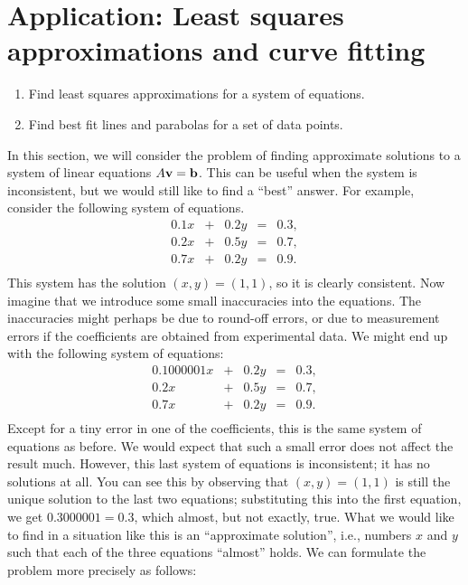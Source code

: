\section{Application: Least squares approximations and curve fitting}
\label{sec:least-squares}

\begin{outcome}
  \begin{enumerate}
  \item Find least squares approximations for a system of equations.
  \item Find best fit lines and parabolas for a set of data points.
  \end{enumerate}
\end{outcome}

In this section, we will consider the problem of finding approximate
solutions to a system of linear equations $A\vect{v}=\vect{b}$. This
can be useful when the system is inconsistent, but we would still like
to find a ``best'' answer. For example, consider the following system
of equations.
\begin{equation*}
  \begin{array}{rcrcl}
    0.1 x &+& 0.2 y &=& 0.3, \\
    0.2 x &+& 0.5 y &=& 0.7, \\
    0.7 x &+& 0.2 y &=& 0.9. \\
  \end{array}
\end{equation*}
This system has the solution $(x,y)=(1,1)$, so it is clearly
consistent. Now imagine that we introduce some small inaccuracies into
the equations. The inaccuracies might perhaps be due to round-off
errors, or due to measurement errors if the coefficients are obtained
from experimental data. We might end up with the following system of
equations:
\begin{equation*}
  \begin{array}{rcrcl}
    0.1000001 x &+& 0.2 y &=& 0.3, \\
    0.2 x &+& 0.5 y &=& 0.7, \\
    0.7 x &+& 0.2 y &=& 0.9. \\
  \end{array}
\end{equation*}
Except for a tiny error in one of the coefficients, this is the same
system of equations as before. We would expect that such a small error
does not affect the result much. However, this last system of
equations is inconsistent; it has no solutions at all. You can see
this by observing that $(x,y)=(1,1)$ is still the unique solution to
the last two equations; substituting this into the first equation, we
get $0.3000001 = 0.3$, which almost, but not exactly, true. What we
would like to find in a situation like this is an ``approximate
solution'', i.e., numbers $x$ and $y$ such that each of the three
equations ``almost'' holds. We can formulate the problem more
precisely as follows:

